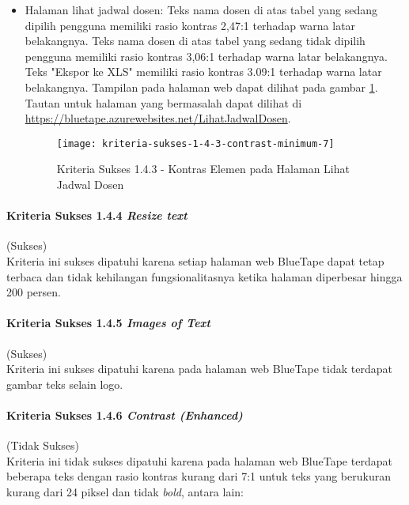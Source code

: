 \begin{itemize}
    \item Halaman lihat jadwal dosen: Teks nama dosen di atas tabel yang sedang dipilih pengguna memiliki rasio kontras 2,47:1 terhadap warna latar belakangnya. Teks nama dosen di atas tabel yang sedang tidak dipilih pengguna memiliki rasio kontras 3,06:1 terhadap warna latar belakangnya. Teks "Ekspor ke XLS" memiliki rasio kontras 3.09:1 terhadap warna latar belakangnya. Tampilan pada halaman web dapat dilihat pada gambar \ref{fig:1.4.3_contrast_minimum_7}. Tautan untuk halaman yang bermasalah dapat dilihat di \url{https://bluetape.azurewebsites.net/LihatJadwalDosen}.
    \begin{figure}[H]
        \centering  
        \texttt{[image: kriteria-sukses-1-4-3-contrast-minimum-7]}  
        \caption[Kriteria Sukses 1.4.3 - Kontras Elemen pada Halaman Lihat Jadwal Dosen]{Kriteria Sukses 1.4.3 - Kontras Elemen pada Halaman Lihat Jadwal Dosen}
        \label{fig:1.4.3_contrast_minimum_7}  
    \end{figure} 
\end{itemize}

\paragraph{Kriteria Sukses 1.4.4 \textit{Resize text}}
\label{par:kepatuhan_bluetape_kriteria_sukses_1.4.4}
(Sukses)\\

Kriteria ini sukses dipatuhi karena setiap halaman web BlueTape dapat tetap terbaca dan tidak kehilangan fungsionalitasnya ketika halaman diperbesar hingga 200 persen. 

\paragraph{Kriteria Sukses 1.4.5 \textit{Images of Text}}
\label{par:kepatuhan_bluetape_kriteria_sukses_1.4.5}
(Sukses)\\

Kriteria ini sukses dipatuhi karena pada halaman web BlueTape tidak terdapat gambar teks selain logo.

\paragraph{Kriteria Sukses 1.4.6 \textit{Contrast (Enhanced)}}
\label{par:kepatuhan_bluetape_kriteria_sukses_1.4.6}
(Tidak Sukses)\\

Kriteria ini tidak sukses dipatuhi karena pada halaman web BlueTape terdapat beberapa teks dengan rasio kontras kurang dari 7:1 untuk teks yang berukuran kurang dari 24 piksel dan tidak \textit{bold}, antara lain:

